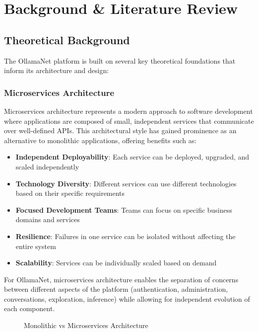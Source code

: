 \def\chapdir{./Chapter02}

\chapter{Background \& Literature Review} \label{ch:background}

\section{Theoretical Background}

The OllamaNet platform is built on several key theoretical foundations that inform its architecture and design:

\subsection{Microservices Architecture}

Microservices architecture represents a modern approach to software development where applications are composed of small, independent services that communicate over well-defined APIs. This architectural style has gained prominence as an alternative to monolithic applications, offering benefits such as:

\begin{itemize}
    \item \textbf{Independent Deployability}: Each service can be deployed, upgraded, and scaled independently
    \item \textbf{Technology Diversity}: Different services can use different technologies based on their specific requirements
    \item \textbf{Focused Development Teams}: Teams can focus on specific business domains and services
    \item \textbf{Resilience}: Failures in one service can be isolated without affecting the entire system
    \item \textbf{Scalability}: Services can be individually scaled based on demand
\end{itemize}

For OllamaNet, microservices architecture enables the separation of concerns between different aspects of the platform (authentication, administration, conversations, exploration, inference) while allowing for independent evolution of each component.

\begin{figure}
    \centering
    \caption{Monolithic vs Microservices Architecture}
    \label{fig:mono-vs-micro}
\end{figure}

